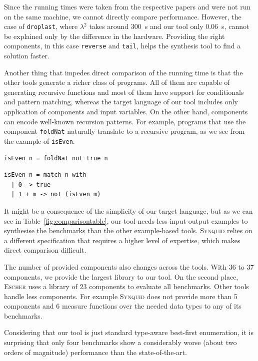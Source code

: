 Since the running times were taken from the respective papers and were not run on the same machine, we cannot directly compare performance. However, the case of \lstinline?droplast?, where \textsc{$\lambda^2$} takes around \SI{300}{s} and our tool only \SI{0.06}{s}, cannot be explained only by the difference in the hardware. Providing the right components, in this case \lstinline?reverse? and \lstinline?tail?, helps the synthesis tool to find a solution faster.

Another thing that impedes direct comparison of the running time is that the other tools generate a richer class of programs. All of them are capable of generating recursive functions and most of them have support for conditionals and pattern matching, whereas the target language of our tool includes only application of components and input variables. On the other hand, components can encode well-known recursion patterns. For example, programs that use the component \lstinline?foldNat? naturally translate to a recursive program, as we see from the example of \lstinline?isEven?.
\begin{lstlisting}[style=plain]
isEven n = foldNat not true n
\end{lstlisting}
\begin{lstlisting}[style=plain]
isEven n = match n with
  | 0 -> true
  | 1 + m -> not (isEven m)
\end{lstlisting}

It might be a consequence of the simplicity of our target language, but as we can see in Table~\ref{fig:comparisontable}, our tool needs less input-output examples to synthesise the benchmarks than the other example-based tools. \textsc{Synquid} relies on a different specification that requires a higher level of expertise, which makes direct comparison difficult.

The number of provided components also changes across the tools. With $36$ to $37$ components, we provide the largest library to our tool. On the second place, \textsc{Escher} uses a library of $23$ components to evaluate all benchmarks. Other tools handle less components. For example \textsc{Synquid} does not provide more than 5 components and 6 measure functions over the needed data types to any of its benchmarks.

Considering that our tool is just standard type-aware best-first enumeration, it is surprising that only four benchmarks show a considerably worse (about two orders of magnitude) performance than the state-of-the-art.


